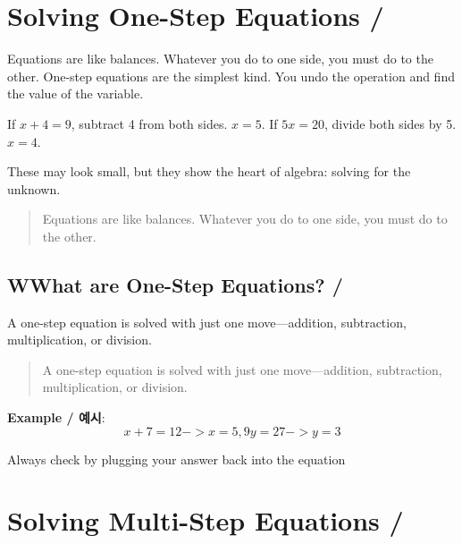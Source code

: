 \newpage
\section{Solving One-Step Equations / }

Equations are like balances. Whatever you do to one side, you must do to the other. One-step equations are the simplest kind. You undo the operation and find the value of the variable. 

If \(x + 4 = 9\), subtract 4 from both sides. \(x = 5\).  
If \(5x = 20\), divide both sides by 5. \(x = 4\). 

These may look small, but they show the heart of algebra: solving for the unknown.  

\blockquote{Equations are like balances. Whatever you do to one side, you must do to the other.}

\subsection{WWhat are One-Step Equations? / }
A one-step equation is solved with just one move—addition, subtraction, multiplication, or division.  

\blockquote{A one-step equation is solved with just one move—addition, subtraction, multiplication, or division.}

\textbf{Example / 예시}:  
\[
x + 7 = 12 -> x = 5, 
9y = 27 -> y = 3
\]

Always check by plugging your answer back into the equation

























\newpage
\section{Solving Multi-Step Equations / }

